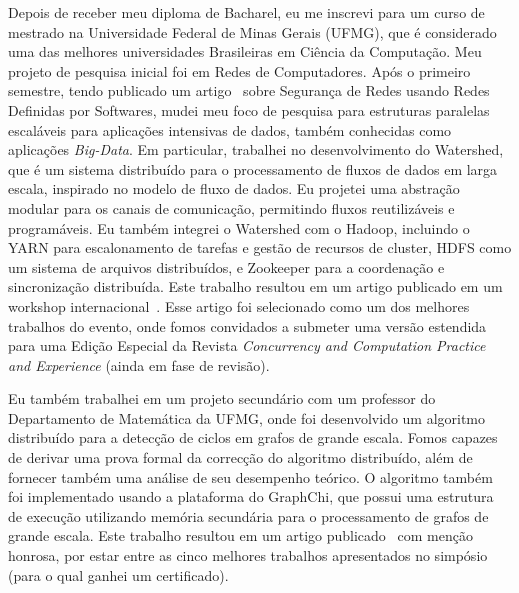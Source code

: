 \documentclass{article}
\begin{document}
Depois de receber meu diploma de Bacharel, eu me inscrevi para um curso de
mestrado na Universidade Federal de Minas Gerais (UFMG), que \'{e} considerado
uma das melhores universidades Brasileiras em Ci\^{e}ncia da
Computa\c{c}\~{a}o.  Meu projeto de pesquisa inicial foi em Redes de
Computadores. Ap\'{o}s o primeiro semestre, tendo publicado um
artigo~\cite{rocha2013smtd} sobre Seguran\c{c}a de Redes usando Redes Definidas
por Softwares, mudei meu foco de pesquisa para estruturas paralelas
escal\'{a}veis para aplica\c{c}\~{o}es intensivas de dados, tamb\'{e}m
conhecidas como aplica\c{c}\~{o}es {\em Big-Data}.
Em particular, trabalhei no desenvolvimento do Watershed, que \'{e} um sistema
distribu\'{i}do para o processamento de fluxos de dados em larga escala,
inspirado no modelo de fluxo de dados. Eu projetei uma abstra\c{c}\~{a}o
modular para os canais de comunica\c{c}\~{a}o, permitindo fluxos
reutiliz\'{a}veis e program\'{a}veis. Eu tamb\'{e}m integrei o Watershed com o
Hadoop, incluindo o YARN para escalonamento de tarefas e gest\~{a}o de recursos
de cluster, HDFS como um sistema de arquivos distribu\'{i}dos, e Zookeeper para
a coordena\c{c}\~{a}o e sincroniza\c{c}\~{a}o distribu\'{i}da.  Este trabalho
resultou em um artigo publicado em um workshop
internacional~\cite{rocha2014watershed}. Esse artigo foi selecionado como um
dos melhores trabalhos do evento, onde fomos convidados a submeter uma
vers\~{a}o estendida para uma Edi\c{c}\~{a}o Especial da Revista {\em
Concurrency and Computation Practice and Experience} (ainda em fase de
revis\~{a}o).

Eu tamb\'{e}m trabalhei em um projeto secund\'{a}rio com um professor do
Departamento de Matem\'{a}tica da UFMG, onde foi desenvolvido um algoritmo
distribu\'{i}do para a detec\c{c}\~{a}o de ciclos em grafos de grande escala.
Fomos capazes de derivar uma prova formal da correc\c{c}\~{a}o do algoritmo
distribu\'{i}do, al\'{e}m de fornecer tamb\'{e}m uma an\'{a}lise de seu
desempenho te\'{o}rico. O algoritmo tamb\'{e}m foi implementado usando a
plataforma do GraphChi, que possui uma estrutura de execu\c{c}\~{a}o utilizando
mem\'{o}ria secund\'{a}ria para o processamento de grafos de grande escala.
Este trabalho resultou em um artigo publicado~\cite{rocha2015cycles} com
men\c{c}\~{a}o honrosa, por estar entre as cinco melhores trabalhos
apresentados no simp\'{o}sio (para o qual ganhei um certificado).
\end{document}
